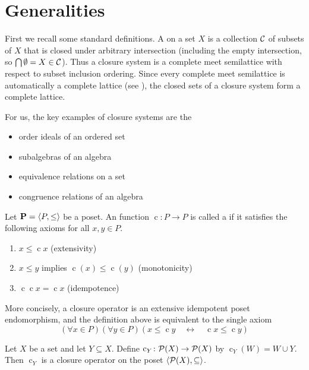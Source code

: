\section{Generalities}
\label{sec:more-gener-appr}


First we recall some standard definitions.
A  on a set $X$ is a collection $\mathcal{C}$
of subsets of $X$ that is closed under arbitrary intersection (including the empty 
intersection, so $\bigcap \emptyset = X \in \mathcal{C}$). 
Thus a closure system is a complete meet semilattice with respect to subset
inclusion ordering. 
Since every complete meet semilattice is automatically a complete lattice
(see \cite[Theorem 2.5]{Nation-notes}), 
the closed sets of a closure system form a complete lattice. 

For us, the key examples of closure systems are the
\begin{itemize}
\item order ideals of an ordered set
\item subalgebras of an algebra 
\item equivalence relations on a set
\item congruence relations of an algebra
\end{itemize}

\newcommand{\cl}{\ensuremath{\operatorname{c}}}

Let $\mathbf{P} = \langle P, \leq \rangle$ be a poset.
An function $\cl \colon P \to P$ is called a 
if it satisfies the following axioms for all $x, y\in P$.
\begin{enumerate}
\item $x \leq \cl x$ (extensivity) 
\item $x \leq y$ implies $\cl(x) \leq \cl(y)$ (monotonicity) 
\item $\cl \cl x = \cl x$ (idempotence) 
\end{enumerate}
More concisely, a closure operator is an extensive idempotent poset endomorphism,
and the definition above is equivalent to the single axiom
\[
(\forall x \in P)(\forall y \in P) (x \leq \cl y \quad \longleftrightarrow  \quad \cl x \leq  \cl y)
\]

\begin{example}
Let $X$ be a set and let $Y \subseteq X$.
Define $\cl_Y\colon \sP(X) \to \sP(X)$ by $\cl_Y (W) = W \cup Y$.
Then $\cl_Y$ is a closure operator on the poset $\langle\mathcal{P}(X), \subseteq\rangle$.
\end{example}

